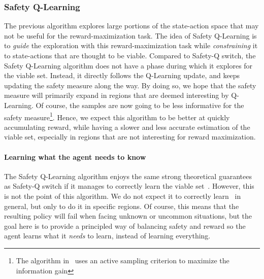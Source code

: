 \subsubsection{Safety Q-Learning}
The previous algorithm explores large portions of the state-action space that may not be useful for the reward-maximization task. The idea of Safety Q-Learning is to\emph{ guide} the exploration with this reward-maximization task while\emph{ constraining} it to state-actions that are thought to be viable. Compared to Safety-Q switch, the Safety Q-Learning algorithm does not have a phase during which it explores for the viable set. Instead, it directly follows the Q-Learning update, and keeps updating the safety measure along the way. By doing so, we hope that the safety measure will primarily expand in regions that are deemed interesting by Q-Learning. Of course, the samples are now going to be less informative for the safety measure\footnote{The algorithm in~\cite{heim2020learnable} uses an active sampling criterion to maximize the information gain}. Hence, we expect this algorithm to be better at quickly accumulating reward, while having a slower and less accurate estimation of the viable set, especially in regions that are not interesting for reward maximization.%
\paragraph{Learning what the agent needs to know}The Safety Q-Learning algorithm enjoys the same strong theoretical guarantees as Safety-Q switch if it manages to correctly learn the viable set~\QV. However, this is not the point of this algorithm. We do not expect it to correctly learn \QV~in general, but only to do it in specific regions. Of course, this means that the resulting policy will fail when facing unknown or uncommon situations, but the goal here is to provide a principled way of balancing safety and reward so the agent learns what it\emph{ needs} to learn, instead of learning everything.

